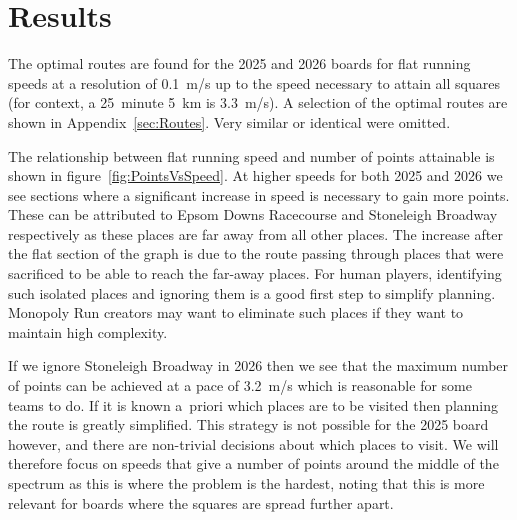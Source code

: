 \section{Results}
\label{sec:Results}

The optimal routes are found for the 2025 and 2026 boards for flat running speeds at a resolution of 0.1~m/s up to the speed necessary to attain all squares (for context, a 25~minute 5~km is 3.3~m/s). A selection of the optimal routes are shown in Appendix~\ref{sec:Routes}. Very similar or identical were omitted.

The relationship between flat running speed and number of points attainable is shown in figure~\ref{fig:PointsVsSpeed}. At higher speeds for both 2025 and 2026 we see sections where a significant increase in speed is necessary to gain more points. These can be attributed to Epsom Downs Racecourse and Stoneleigh Broadway respectively as these places are far away from all other places. The increase after the flat section of the graph is due to the route passing through places that were sacrificed to be able to reach the far-away places. For human players, identifying such isolated places and ignoring them is a good first step to simplify planning. Monopoly Run creators may want to eliminate such places if they want to maintain high complexity.

If we ignore Stoneleigh Broadway in 2026 then we see that the maximum number of points can be achieved at a pace of 3.2~m/s which is reasonable for some teams to do. If it is known a~priori which places are to be visited then planning the route is greatly simplified. This strategy is not possible for the 2025 board however, and there are non-trivial decisions about which places to visit. We will therefore focus on speeds that give a number of points around the middle of the spectrum as this is where the problem is the hardest, noting that this is more relevant for boards where the squares are spread further apart.

\vfill

